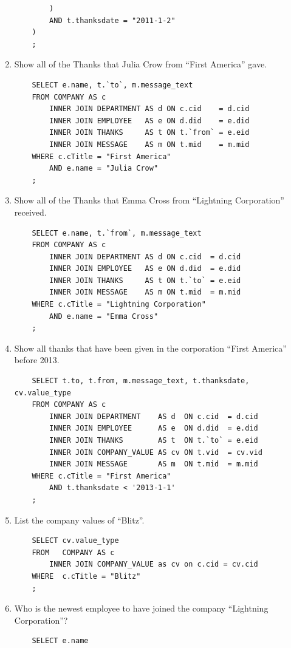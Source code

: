 \documentclass[11pt]{report}
\begin{document}
\begin{enumerate}
\begin{verbatim}
        )
        AND t.thanksdate = "2011-1-2"
    )
    ;
    \end{verbatim}
    \item Show all of the Thanks that Julia Crow from ``First America'' gave.
    \begin{verbatim}
    SELECT e.name, t.`to`, m.message_text
    FROM COMPANY AS c
        INNER JOIN DEPARTMENT AS d ON c.cid    = d.cid
        INNER JOIN EMPLOYEE   AS e ON d.did    = e.did
        INNER JOIN THANKS     AS t ON t.`from` = e.eid
        INNER JOIN MESSAGE    AS m ON t.mid    = m.mid
    WHERE c.cTitle = "First America"
        AND e.name = "Julia Crow"
    ;
    \end{verbatim}
    \item Show all of the Thanks that Emma Cross from ``Lightning Corporation'' received.
    \begin{verbatim}
    SELECT e.name, t.`from`, m.message_text
    FROM COMPANY AS c
        INNER JOIN DEPARTMENT AS d ON c.cid  = d.cid
        INNER JOIN EMPLOYEE   AS e ON d.did  = e.did
        INNER JOIN THANKS     AS t ON t.`to` = e.eid
        INNER JOIN MESSAGE    AS m ON t.mid  = m.mid
    WHERE c.cTitle = "Lightning Corporation"
        AND e.name = "Emma Cross"
    ;
    \end{verbatim}
    \item Show all thanks that have been given in the corporation ``First America'' before 2013.
    \begin{verbatim}
    SELECT t.to, t.from, m.message_text, t.thanksdate, cv.value_type
    FROM COMPANY AS c
        INNER JOIN DEPARTMENT    AS d  ON c.cid  = d.cid
        INNER JOIN EMPLOYEE      AS e  ON d.did  = e.did
        INNER JOIN THANKS        AS t  ON t.`to` = e.eid
        INNER JOIN COMPANY_VALUE AS cv ON t.vid  = cv.vid
        INNER JOIN MESSAGE       AS m  ON t.mid  = m.mid
    WHERE c.cTitle = "First America"
        AND t.thanksdate < '2013-1-1'
    ;
    \end{verbatim}
    \item List the company values of ``Blitz''.
    \begin{verbatim}
    SELECT cv.value_type
    FROM   COMPANY AS c
        INNER JOIN COMPANY_VALUE as cv on c.cid = cv.cid
    WHERE  c.cTitle = "Blitz"
    ;
    \end{verbatim}
    \item Who is the newest employee to have joined the company ``Lightning Corporation''?
    \begin{verbatim}
    SELECT e.name

\end{verbatim}
\end{enumerate}
\end{document}
